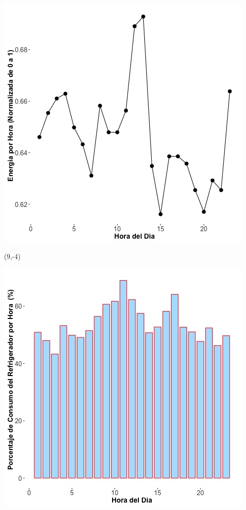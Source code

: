 \documentclass{article}\usepackage[]{graphicx}\usepackage[]{color}
\newenvironment{knitrout}{}{} %
\begin{document}
\begin{knitrout}
\color{fgcolor}
\includegraphics[scale=0.75]{figure/A20_fplot_norm_median} 
\end{knitrout}


 \begin{textblock}{1}(9,-4)
\begin{minipage}{20em}
\begingroup

\endgroup
\end{minipage}
\end{textblock}

 \vspace{2cm}

\begin{knitrout}
\color{fgcolor}
\includegraphics[scale=0.65]{figure/A20_fridge_energy_pct.jpg} 
\end{knitrout}
\end{document}
